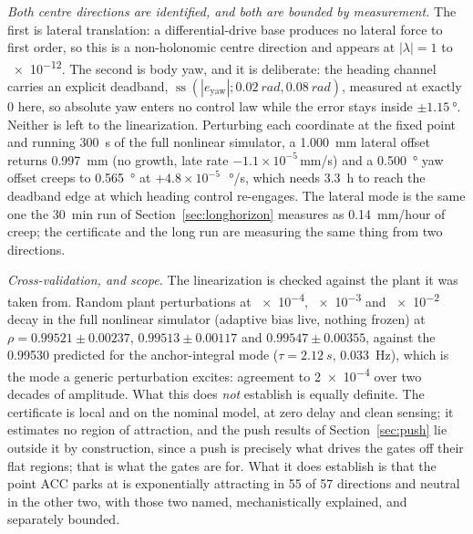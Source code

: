 \documentclass[a4paper,fleqn]{cas-dc}
\begin{document}
\emph{Both centre directions are identified, and both are bounded by measurement.} The first is lateral translation: a differential-drive base produces no lateral force to first order, so this is a non-holonomic centre direction and appears at $|\lambda|{=}1$ to \num{e-12}. The second is body yaw, and it is deliberate: the heading channel carries an explicit deadband, $\operatorname{ss}(|e_{\text{yaw}}|;\SI{0.02}{rad},\SI{0.08}{rad})$, measured at exactly \num{0} here, so absolute yaw enters no control law while the error stays inside $\pm\SI{1.15}{\degree}$. Neither is left to the linearization. Perturbing each coordinate at the fixed point and running \SI{300}{s} of the full nonlinear simulator, a \SI{1.000}{mm} lateral offset returns \SI{0.997}{mm} (no growth, late rate $-1.1{\times}10^{-5}$\,mm/s) and a \SI{0.500}{\degree} yaw offset creeps to \SI{0.565}{\degree} at $+4.8{\times}10^{-5}$\,\SI{}{\degree/s}, which needs \SI{3.3}{h} to reach the deadband edge at which heading control re-engages. The lateral mode is the same one the \SI{30}{min} run of Section~\ref{sec:longhorizon} measures as \SI{0.14}{mm/hour} of creep; the certificate and the long run are measuring the same thing from two directions.

\emph{Cross-validation, and scope.} The linearization is checked against the plant it was taken from. Random plant perturbations at \num{e-4}, \num{e-3} and \num{e-2} decay in the full nonlinear simulator (adaptive bias live, nothing frozen) at $\rho{=}0.99521{\pm}0.00237$, $0.99513{\pm}0.00117$ and $0.99547{\pm}0.00355$, against the \num{0.99530} predicted for the anchor-integral mode ($\tau{=}\SI{2.12}{s}$, \SI{0.033}{Hz}), which is the mode a generic perturbation excites: agreement to \num{2e-4} over two decades of amplitude. What this does \emph{not} establish is equally definite. The certificate is local and on the nominal model, at zero delay and clean sensing; it estimates no region of attraction, and the push results of Section~\ref{sec:push} lie outside it by construction, since a push is precisely what drives the gates off their flat regions; that is what the gates are for. What it does establish is that the point ACC parks at is exponentially attracting in \num{55} of \num{57} directions and neutral in the other two, with those two named, mechanistically explained, and separately bounded.
\end{document}
